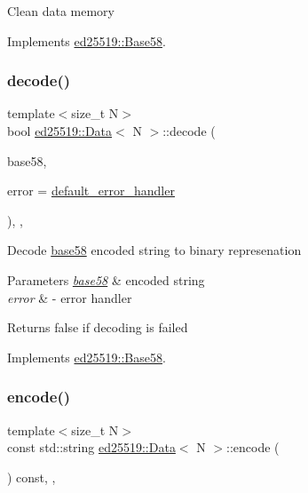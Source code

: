 Clean data memory 

Implements \mbox{\hyperlink{classed25519_1_1_base58_aed901927e6a283e0c4d3fb13745233dc}{ed25519\+::\+Base58}}.

\mbox{\label{classed25519_1_1_data_a281d932d3c3fe7fd40ce86ea7eff559b}} 
\subsubsection{\texorpdfstring{decode()}{decode()}}
{\footnotesize\ttfamily template$<$size\+\_\+t N$>$ \\
bool \mbox{\hyperlink{classed25519_1_1_data}{ed25519\+::\+Data}}$<$ N $>$\+::decode (\begin{DoxyParamCaption}\item[{const std\+::string \&}]{base58,  }\item[{const \mbox{\hyperlink{namespaceed25519_a6ba572942b3c18591fc869d52a6b16e6}{Error\+Handler}} \&}]{error = {\ttfamily \mbox{\hyperlink{namespaceed25519_a7c7bb6ed17541162959c33ed3e3b15fb}{default\+\_\+error\+\_\+handler}}} }\end{DoxyParamCaption})\hspace{0.3cm}{\ttfamily [inline]}, {\ttfamily [override]}, {\ttfamily [virtual]}}

Decode \mbox{\hyperlink{namespaceed25519_1_1base58}{base58}} encoded string to binary represenation 
\begin{DoxyParams}{Parameters}
{\em \mbox{\hyperlink{namespaceed25519_1_1base58}{base58}}} & encoded string \\
\hline
{\em error} & -\/ error handler \\
\hline
\end{DoxyParams}
\begin{DoxyReturn}{Returns}
false if decoding is failed 
\end{DoxyReturn}


Implements \mbox{\hyperlink{classed25519_1_1_base58_a3cb74be32923dcfb03a24b65015bee84}{ed25519\+::\+Base58}}.

\mbox{\label{classed25519_1_1_data_a2dc2e23b950a10b168d7509a63ffca53}} 
\subsubsection{\texorpdfstring{encode()}{encode()}}
{\footnotesize\ttfamily template$<$size\+\_\+t N$>$ \\
const std\+::string \mbox{\hyperlink{classed25519_1_1_data}{ed25519\+::\+Data}}$<$ N $>$\+::encode (\begin{DoxyParamCaption}{ }\end{DoxyParamCaption}) const\hspace{0.3cm}{\ttfamily [inline]}, {\ttfamily [override]}, {\ttfamily [virtual]}}

